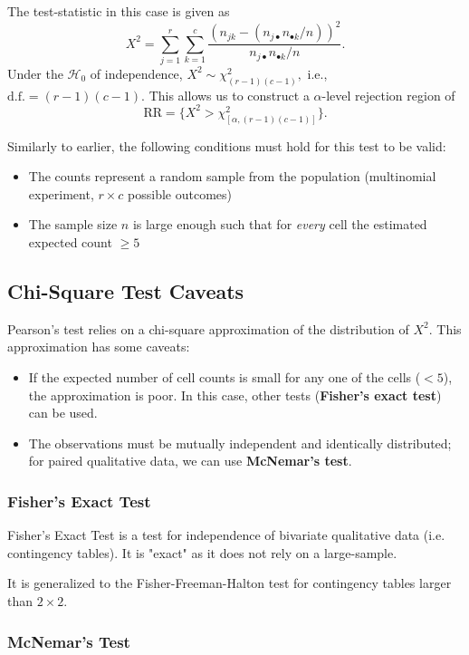 \documentclass[12pt]{article}
\begin{document}
The test-statistic in this case is given as \[X^2 = \sum_{j=1}^r \sum_{k=1}^c\frac{(n_{jk} - (n_{j\bullet} n_{\bullet k}/n))^2}{n_{j \bullet} n_{\bullet k}/n}.\] Under the $\mathcal{H}_0$ of independence, $X^2 \sim \chi^2_{(r-1)(c-1)},$ i.e., $\text{d.f.} = (r-1)(c-1)$. This allows us to construct a $\alpha$-level rejection region of \[\text{RR} = \{X^2 > \chi^2_{[\alpha, (r-1)(c-1)]}\}.\] 

Similarly to earlier, the following conditions must hold for this test to be valid:

\begin{itemize}
    \item The counts represent a random sample from the population (multinomial experiment, $r\times c$ possible outcomes)
    \item The sample size $n$ is large enough such that for \textit{every} cell the estimated expected count $\geq 5$
\end{itemize}

\subsection{Chi-Square Test Caveats}

Pearson's test relies on a chi-square approximation of the distribution of $X^2$. This approximation has some caveats:
\begin{itemize}
    \item If the expected number of cell counts is small for any one of the cells ($<5$), the approximation is poor. In this case, other tests (\textbf{Fisher's exact test}) can be used.
    \item The observations must be mutually independent and identically distributed; for paired qualitative data, we can use \textbf{McNemar's test}.
\end{itemize}

\subsubsection{Fisher's Exact Test}
Fisher's Exact Test is a test for independence of bivariate qualitative data (i.e. contingency tables). It is "exact" as it does not rely on a large-sample. 

It is generalized to the Fisher-Freeman-Halton test for contingency tables larger than $2 \times 2$.

\subsubsection{McNemar's Test}
\end{document}
